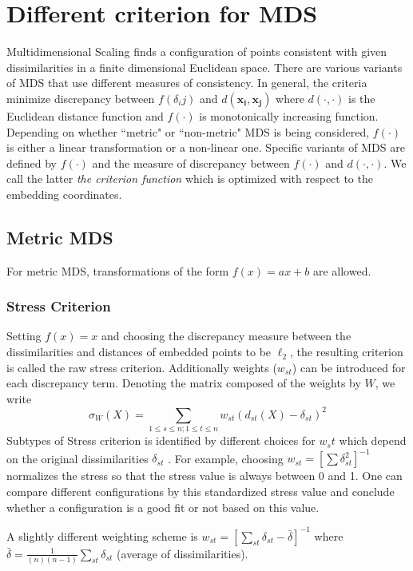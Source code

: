 \documentclass[12pt,oneside,final]{thesis}
\begin{document}
\section{Different criterion for MDS \label{sec:MDSvariant}}
Multidimensional Scaling finds a configuration of points consistent with given dissimilarities in a finite dimensional Euclidean space. There are various variants of MDS that use different measures of consistency.  In general, the criteria minimize discrepancy between $f(\delta_ij)$ and  $d(\bm{x_i},\bm{x_j})$ where $d(\cdot,\cdot)$ is the Euclidean distance function and $f(\cdot)$ is monotonically increasing function. Depending on whether ``metric" or ``non-metric" MDS is being considered, $f(\cdot)$ is either a linear transformation or a non-linear one. Specific variants of MDS are defined by $f(\cdot)$ and the measure of discrepancy between  $f(\cdot)$ and $d(\cdot,\cdot)$. We call the latter \emph{the criterion function} which is optimized with respect to the embedding coordinates.


\subsection{Metric MDS}
 For metric MDS, transformations of the form  $f(x)=ax+b$ are allowed.
 \subsubsection{Stress Criterion}
 Setting $f(x)=x$ and choosing  the discrepancy measure between the dissimilarities and distances of embedded points to be $\ell_2$, the resulting criterion is called the raw stress criterion. Additionally weights ($w_{st}$) can be introduced for each discrepancy term. Denoting the matrix composed of the weights by $W$, we write
 \begin{equation}
\sigma_{W}(X)=\sum_{1\leq s\leq n;1\leq t\leq n} {w_{st}(d_{st}(X)-\delta_{st})^2  }\label{raw-stress}
\end{equation}
Subtypes of Stress criterion is identified by different choices for $w_st$ which depend on the original dissimilarities $\delta_{st}$ .
For example, choosing $w_{st}=\left[{\sum{\delta_{st}^2}}\right]^{-1}$ normalizes the stress so that the stress value is always between 0 and 1. One can compare different configurations by this standardized stress value and conclude whether a configuration is a good fit or not based on this value.

A slightly different weighting scheme is $w_{st}=\left[ \sum_{st}{\delta_{st}-\bar{\delta} } \right]^{-1}$ 
where $\bar{\delta}=\frac{1}{(n)(n-1)} \sum_{st}{\delta_{st}}$ (average of dissimilarities).
\end{document}
